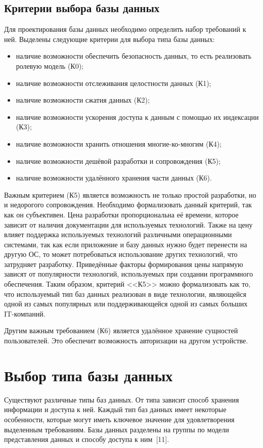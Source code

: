 \subsection*{Критерии выбора базы данных}
Для проектирования базы данных необходимо определить набор требований к ней.
Выделены следующие критерии для выбора типа базы данных:
\begin{itemize}
    \item наличие возможности обеспечить безопасность данных, то есть реализовать ролевую модель (К0);
    \item наличие возможности отслеживания целостности данных (К1);
    \item наличие возможности сжатия данных (К2);
    \item наличие возможности ускорения доступа к данным с помощью их индексации (К3);
    \item наличие возможности хранить отношения многие-ко-многим (К4);
    \item наличие возможности дешёвой разработки и сопровождения (К5);
    \item наличие возможности удалённого хранения части данных (К6).
\end{itemize}

Важным критерием (К5) является возможность не только простой разработки, но и недорогого сопровождения.
Необходимо формализовать данный критерий, так как он субъективен.
Цена разработки пропорциональна её времени, которое зависит от наличия документации для используемых технологий.
Также на цену влияет поддержка используемых технологий различными операционными системами, так как если приложение и базу данных нужно будет перенести на другую ОС, то может потребоваться использование других технологий, что затрудняет разработку.
Приведённые факторы формирования цены напрямую зависят от популярности технологий, используемых при создании программного обеспечения.
Таким образом, критерий <<К5>> можно формализовать как то, что используемый тип баз данных реализован в виде технологии, являющейся одной из самых популярных или поддерживающейся одной из самых больших IT-компаний.

Другим важным требованием (К6) является удалённое хранение сущностей пользователей.
Это обеспечит возможность авторизации на другом устройстве.

\section{Выбор типа базы данных}
Существуют различные типы баз данных.
От типа зависит способ хранения информации и доступа к ней.
Каждый тип баз данных имеет некоторые особенности, которые могут иметь ключевое значение для удовлетворения выделенным требованиям.
Базы данных разделены на группы по модели представления данных и способу доступа к ним~[11].


